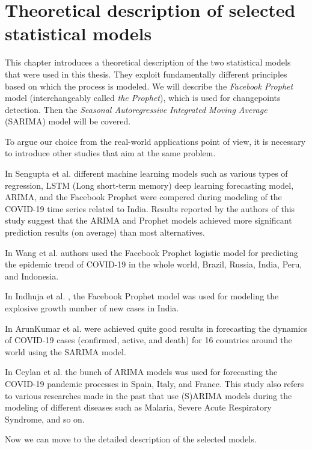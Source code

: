 \hypertarget{ch2}{\chapter{Theoretical description of selected statistical models}}

This chapter introduces a theoretical description of the two statistical models that were used in this thesis. They exploit fundamentally different principles based on which the process is modeled. We will describe the \textit{Facebook Prophet} model (interchangeably called \textit{the Prophet}), which is used for changepoints detection. Then the \textit{Seasonal Autoregressive Integrated Moving Average} (SARIMA) model will be covered. 

To argue our choice from the real-world applications point of view, it is necessary to introduce other studies that aim at the same problem. 

In Sengupta et al. \cite{Sengupta2020.06.25.20140004} different machine learning models such as various types of regression, LSTM (Long short-term memory) deep learning forecasting model, ARIMA, and the Facebook Prophet were compered during modeling of the COVID-19 time series related to India. Results reported by the authors of this study suggest that the ARIMA and Prophet models achieved more significant prediction results (on average) than most alternatives.

In Wang et al. \cite{WANG2020110058} authors used the Facebook Prophet logistic model for predicting the epidemic trend of COVID-19 in the whole world, Brazil, Russia, India, Peru, and Indonesia.

In Indhuja et al. \cite{indhuja2020prediction}, the Facebook Prophet model was used for modeling the explosive growth number of new cases in India.

In ArunKumar et al. \cite{ARUNKUMAR2021107161} were achieved quite good results in forecasting the dynamics of COVID-19 cases (confirmed, active, and death) for 16 countries around the world using the SARIMA model. 

In Ceylan et al. \cite{CEYLAN2020138817} the bunch of ARIMA models was used for forecasting the COVID-19 pandemic processes in Spain, Italy, and France. This study also refers to various researches made in the past that use (S)ARIMA models during the modeling of different diseases such as Malaria, Severe Acute Respiratory Syndrome, and so on.

Now we can move to the detailed description of the selected models.

